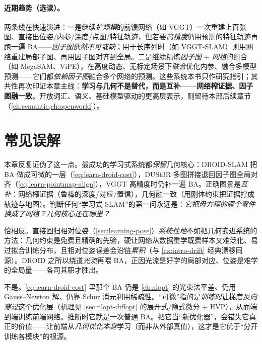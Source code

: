 \paragraph{近期趋势（选读）。}
两条线在快速演进\cite{teed2026boosting}：一是继续\emph{扩规模}的前馈网络（如 VGGT）一次重建上百张图、直接出位姿/内参/深度/点图/特征轨迹，但若要\emph{高精度}仍用预测的特征轨迹再跑一遍 BA——\emph{因子图依然不可或缺}；用于长序列时（如 VGGT-SLAM）则用网络重建局部子图、再用因子图对齐到全局。二是继续精炼\emph{因子图 $+$ 网络}的组合（如 MegaSAM、ViPE），在高度动态、无标定场景下\emph{联合}优化内参、融合多模型预测——它们都\emph{依赖因子图}融合多个网络的预测。这些系统本书只作研究指引；其共性再次印证本章主线：\textbf{学习与几何不是替代，而是互补——网络榨证据、因子图融一致}。开放词汇、语义、基础模型驱动的更高层表示，则留待本部后续章节（\cref{ch:semantic,ch:openworld}）。

\section{常见误解}
\label{sec:learning-myths}

\begin{pitfall}
本章反复证伪了这一点。最成功的学习式系统都\emph{保留}几何核心：DROID-SLAM 把 BA 做成可微的一层（\cref{eq:learn-droid-cost}），DUSt3R 多图拼接退回因子图全局对齐（\cref{eq:learn-pointmap-align}），VGGT 高精度时仍补一遍 BA。正确图景是\emph{互补}：网络榨证据（鲁棒的深度/对应/置信），几何融一致（用刚体约束把证据拧成轨迹与地图）。判断任何“学习式 SLAM”的第一问永远是：\emph{它把母方程的哪个零件换成了网络？几何核心还在哪里？}
\end{pitfall}

\begin{pitfall}
恰相反。直接回归相对位姿（\cref{sec:learning-pose}）\emph{系统性地}不如把几何嵌进系统的方法：几何约束是免费且精确的先验，硬让网络从数据重学既费样本又难泛化、易过拟合训练分布，且相对位姿误差会沿链\emph{累积}（与 \cref{ex:intro-drift} 经典漂移同源）。DROID 之所以绕道\emph{光流}再喂 BA，正因光流是好学的局部对应、位姿是难学的全局量——各司其职才胜出。
\end{pitfall}

\begin{pitfall}
不是。\cref{eq:learn-droid-cost} 里那个 BA 仍是 \cref{ch:nlopt} 的光束法平差、仍用 Gauss--Newton 解、仍靠 Schur 消元利用稀疏性。“可微”指的是\emph{训练时}让梯度\emph{反向穿过}这个优化层（机理见 \cref{sec:nlopt-diffopt} 的展开式/隐式微分 $+$ HVP），从而端到端训练前端网络。推断时它就是一次普通 BA。把它当“新优化器”，会错失它真正的价值——让前端从\emph{几何优化本身}学习（而非从外部真值），这才是它优于“分开训练各模块”的根源。
\end{pitfall}

